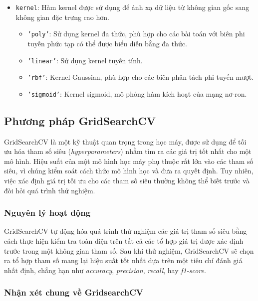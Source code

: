 \documentclass[a4paper,12pt]{article}
\begin{document}
\begin{itemize}
    \item \texttt{kernel}: Hàm kernel được sử dụng để ánh xạ dữ liệu từ không gian gốc sang không gian đặc trưng cao hơn.
    \begin{itemize}
        \item \texttt{'poly'}: Sử dụng kernel đa thức, phù hợp cho các bài toán với biên phi tuyến phức tạp có thể được biểu diễn bằng đa thức.
        \item \texttt{'linear'}: Sử dụng kernel tuyến tính.
        \item \texttt{'rbf'}: Kernel Gaussian, phù hợp cho các biên phân tách phi tuyến mượt.
        \item \texttt{'sigmoid'}: Kernel sigmoid, mô phỏng hàm kích hoạt của mạng nơ-ron.
    \end{itemize}
\end{itemize}

\subsection{Phương pháp GridSearchCV}

\hspace{5mm}GridSearchCV là một kỹ thuật quan trọng trong học máy, được sử dụng để tối ưu hóa tham số siêu (\textit{hyperparameters}) nhằm tìm ra các giá trị tốt nhất cho một mô hình. Hiệu suất của một mô hình học máy phụ thuộc rất lớn vào các tham số siêu, vì chúng kiểm soát cách thức mô hình học và đưa ra quyết định. Tuy nhiên, việc xác định giá trị tối ưu cho các tham số siêu thường không thể biết trước và đòi hỏi quá trình thử nghiệm.

\subsubsection{Nguyên lý hoạt động} 
\hspace{5mm}GridSearchCV tự động hóa quá trình thử nghiệm các giá trị tham số siêu bằng cách thực hiện kiểm tra toàn diện trên tất cả các tổ hợp giá trị được xác định trước trong một không gian tham số. Sau khi thử nghiệm, GridSearchCV sẽ chọn ra tổ hợp tham số mang lại hiệu suất tốt nhất dựa trên một tiêu chí đánh giá nhất định, chẳng hạn như \textit{accuracy}, \textit{precision}, \textit{recall}, hay \textit{f1-score}.

\subsubsection{Nhận xét chung về GridsearchCV}
\end{document}
